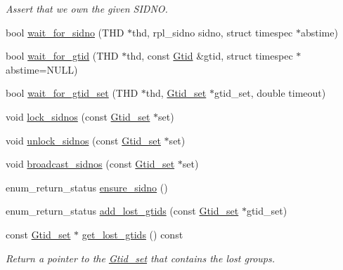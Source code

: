 \begin{DoxyCompactItemize}
\begin{DoxyCompactList}\small\item\em Assert that we own the given S\+I\+D\+NO. \end{DoxyCompactList}\item 
bool \mbox{\hyperlink{classGtid__state_aa05b5e777f238bb2b73e4b6af4666041}{wait\+\_\+for\+\_\+sidno}} (T\+HD $\ast$thd, rpl\+\_\+sidno sidno, struct timespec $\ast$abstime)
\item 
bool \mbox{\hyperlink{classGtid__state_ae54492cf7e8c0f562de64abac2721a37}{wait\+\_\+for\+\_\+gtid}} (T\+HD $\ast$thd, const \mbox{\hyperlink{structGtid}{Gtid}} \&gtid, struct timespec $\ast$abstime=N\+U\+LL)
\item 
bool \mbox{\hyperlink{classGtid__state_ac99ab163cd352da46f80df24f8589bd4}{wait\+\_\+for\+\_\+gtid\+\_\+set}} (T\+HD $\ast$thd, \mbox{\hyperlink{classGtid__set}{Gtid\+\_\+set}} $\ast$gtid\+\_\+set, double timeout)
\item 
void \mbox{\hyperlink{classGtid__state_a774c7aef129010303e01c1be2b588814}{lock\+\_\+sidnos}} (const \mbox{\hyperlink{classGtid__set}{Gtid\+\_\+set}} $\ast$set)
\item 
void \mbox{\hyperlink{classGtid__state_a1df515758938a44f381c98813130cb94}{unlock\+\_\+sidnos}} (const \mbox{\hyperlink{classGtid__set}{Gtid\+\_\+set}} $\ast$set)
\item 
void \mbox{\hyperlink{classGtid__state_acf75c15c777ea5fc24e6bb6c3874974e}{broadcast\+\_\+sidnos}} (const \mbox{\hyperlink{classGtid__set}{Gtid\+\_\+set}} $\ast$set)
\item 
enum\+\_\+return\+\_\+status \mbox{\hyperlink{classGtid__state_a2c05e7cfec3de4245fbbb515ad253630}{ensure\+\_\+sidno}} ()
\item 
enum\+\_\+return\+\_\+status \mbox{\hyperlink{classGtid__state_abd5725a5688d62679a43c837d6bad8fb}{add\+\_\+lost\+\_\+gtids}} (const \mbox{\hyperlink{classGtid__set}{Gtid\+\_\+set}} $\ast$gtid\+\_\+set)
\item 
\mbox{\label{classGtid__state_a15e9415e3475938795b264b39e067765}} 
const \mbox{\hyperlink{classGtid__set}{Gtid\+\_\+set}} $\ast$ \mbox{\hyperlink{classGtid__state_a15e9415e3475938795b264b39e067765}{get\+\_\+lost\+\_\+gtids}} () const
\begin{DoxyCompactList}\small\item\em Return a pointer to the \mbox{\hyperlink{classGtid__set}{Gtid\+\_\+set}} that contains the lost groups. \end{DoxyCompactList}\item 

\end{DoxyCompactItemize}
